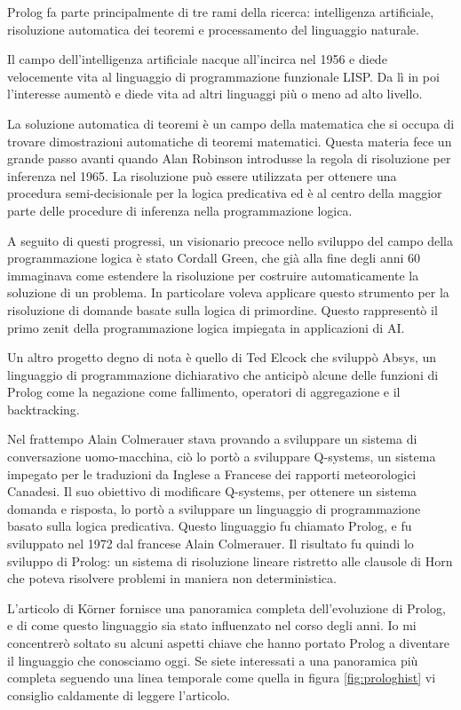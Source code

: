 Prolog fa parte principalmente di tre rami della ricerca: intelligenza artificiale, risoluzione automatica dei teoremi e processamento del linguaggio naturale.

Il campo dell'intelligenza artificiale nacque all'incirca nel 1956 e diede velocemente vita al linguaggio di programmazione funzionale LISP. Da lì in poi 
l'interesse aumentò e diede vita ad altri linguaggi più o meno ad alto livello.

La soluzione automatica di teoremi è un campo della matematica che si occupa di trovare dimostrazioni automatiche di teoremi matematici. Questa materia fece un grande passo avanti quando Alan Robinson introdusse la regola di risoluzione per inferenza nel 1965. La risoluzione può essere utilizzata per ottenere una procedura semi-decisionale per la logica predicativa ed è al centro della maggior parte delle procedure di inferenza nella programmazione logica.

A seguito di questi progressi, un visionario precoce nello sviluppo del campo della programmazione logica è stato Cordall Green, che già alla fine degli anni 60 immaginava come estendere la risoluzione per costruire 
automaticamente la soluzione di un problema. In particolare voleva applicare questo strumento per la risoluzione di domande basate sulla logica di primordine. Questo rappresentò il primo zenit della programmazione logica impiegata in applicazioni di AI.

Un altro progetto degno di nota è quello di Ted Elcock che sviluppò Absys, un linguaggio di programmazione dichiarativo che anticipò alcune delle funzioni di Prolog come la negazione come fallimento, operatori di aggregazione e il backtracking.

Nel frattempo Alain Colmerauer stava provando a sviluppare un sistema di conversazione uomo-macchina, ciò lo portò a sviluppare Q-systems, un sistema impegato per le traduzioni da Inglese a Francese dei rapporti meteorologici Canadesi. 
Il suo obiettivo di modificare Q-systems, per ottenere un sistema domanda e risposta, lo portò a sviluppare un linguaggio di programmazione basato sulla logica predicativa. Questo linguaggio fu chiamato Prolog, e fu sviluppato nel 1972 dal francese Alain Colmerauer.
Il risultato fu quindi lo sviluppo di Prolog: un sistema di risoluzione lineare ristretto alle clausole di Horn che poteva risolvere problemi in maniera non deterministica.

L'articolo di K{\"o}rner \cite{korner2022fifty} fornisce una panoramica completa dell'evoluzione di Prolog, e di come questo linguaggio sia stato influenzato nel corso degli anni. Io mi concentrerò soltato su alcuni aspetti chiave che hanno portato Prolog a diventare il linguaggio che conosciamo oggi.
Se siete interessati a una panoramica più completa seguendo una linea temporale come quella in figura \ref{fig:prologhist} vi consiglio caldamente di leggere l'articolo.
